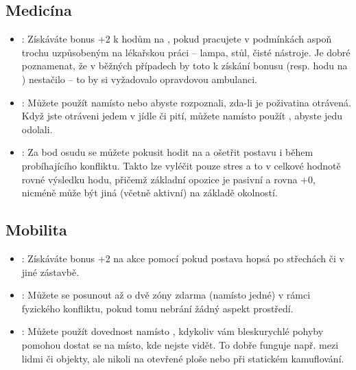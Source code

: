 \documentclass[../main.tex]{subfiles}
\begin{document}
\subsection{Medicína}
\label{sec:trik-medicina}
\begin{itemize}
  
\item{}:
  \label{sec:medicina-ambulance}
Získáváte bonus +2 k hodům na , pokud pracujete v podmínkách aspoň trochu uzpůsobeným na lékařskou práci – lampa, stůl, čisté nástroje. Je dobré poznamenat, že v běžných případech by toto k získání bonusu (resp. hodu na ) nestačilo – to by si vyžadovalo opravdovou ambulanci.

\item{}:
  \label{sec:medicina-vyziva}
Můžete použít  namísto  nebo  abyste rozpoznali, zda-li je poživatina otrávená. Když jste otráveni jedem v jídle či pití, můžete namísto  použít , abyste jedu odolali.

\item{}:
  \label{sec:medicina-boj}
  Za bod osudu se můžete pokusit hodit na  a ošetřit postavu i během probíhajícího konfliktu. Takto lze vyléčit pouze stres a to v celkové hodnotě rovné výsledku hodu, přičemž základní opozice je pasivní a rovna +0, nicméně může být jiná (včetně aktivní) na základě okolností.
\end{itemize}

\subsection{Mobilita}
\label{sec:trik-mobilita}
\begin{itemize}
  
\item{}:
\label{sec:mobilita-parkour}
Získáváte bonus +2 na akce  pomocí  pokud postava hopsá po střechách či v jiné zástavbě.

\item{}:
\label{sec:mobilita-sprinter}
Můžete se posunout až o dvě zóny zdarma (namísto jedné) v rámci fyzického konfliktu, pokud tomu nebrání žádný aspekt prostředí.


\item{}:
\label{sec:mobilita-zmizeni}
Můžete použít dovednost  namísto , kdykoliv vám bleskurychlé pohyby pomohou dostat se na místo, kde nejste vidět. To dobře funguje např. mezi lidmi či objekty, ale nikoli na otevřené ploše nebo při statickém kamuflování.
\end{itemize}
\end{document}

